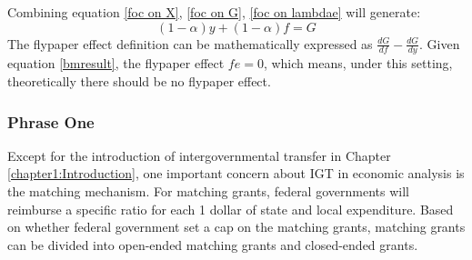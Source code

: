 Combining equation \ref{foc on X}, \ref{foc on G}, \ref{foc on lambdae} will generate:
\begin{equation}
    (1-\alpha)y+(1-\alpha)f=G \label{bmresult}
\end{equation}
The flypaper effect definition can be mathematically expressed as $\frac{d G}{d f}-\frac{d G}{d y}$. Given equation \ref{bmresult}, the flypaper effect $fe=0$, which means, under this setting, theoretically there should be no flypaper effect.
\subsubsection{Phrase One}
Except for the introduction of intergovernmental transfer in Chapter \ref*{chapter1:Introduction}, one important concern about IGT in economic analysis is the matching mechanism. For matching grants, federal governments will reimburse a specific ratio for each 1 dollar of state and local expenditure. Based on whether federal government set a cap on the matching grants, matching grants can be divided into open-ended matching grants and closed-ended grants.



